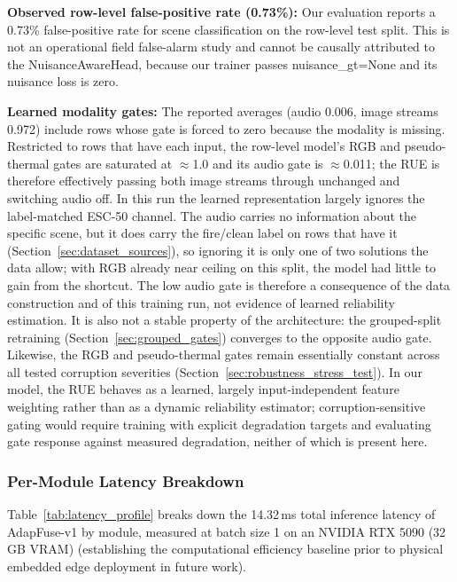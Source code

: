 \documentclass[journal]{IEEEtran}
\begin{document}
\textbf{Observed row-level false-positive rate (0.73\%):}
Our evaluation reports a 0.73\% false-positive rate for scene classification on the row-level test split. This is not an operational field false-alarm study and cannot be causally attributed to the NuisanceAwareHead, because our trainer passes nuisance\_gt=None and its nuisance loss is zero.

\textbf{Learned modality gates:}
The reported averages (audio 0.006, image streams 0.972) include rows whose gate is forced to zero because the modality is missing. Restricted to rows that have each input, the row-level model's RGB and pseudo-thermal gates are saturated at $\approx$1.0 and its audio gate is $\approx$0.011; the RUE is therefore effectively passing both image streams through unchanged and switching audio off. In this run the learned representation largely ignores the label-matched ESC-50 channel. The audio carries no information about the specific scene, but it does carry the fire/clean label on rows that have it (Section~\ref{sec:dataset_sources}), so ignoring it is only one of two solutions the data allow; with RGB already near ceiling on this split, the model had little to gain from the shortcut. The low audio gate is therefore a consequence of the data construction and of this training run, not evidence of learned reliability estimation. It is also not a stable property of the architecture: the grouped-split retraining (Section~\ref{sec:grouped_gates}) converges to the opposite audio gate. Likewise, the RGB and pseudo-thermal gates remain essentially constant across all tested corruption severities (Section~\ref{sec:robustness_stress_test}). In our model, the RUE behaves as a learned, largely input-independent feature weighting rather than as a dynamic reliability estimator; corruption-sensitive gating would require training with explicit degradation targets and evaluating gate response against measured degradation, neither of which is present here.

\subsubsection{Per-Module Latency Breakdown}

Table~\ref{tab:latency_profile} breaks down the 14.32\,ms total inference latency of AdapFuse-v1 by module, measured at batch size 1 on an NVIDIA RTX 5090 (32\,GB VRAM) (establishing the computational efficiency baseline prior to physical embedded edge deployment in future work).
\end{document}
